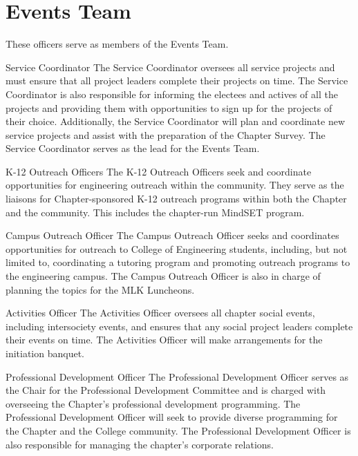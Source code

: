 \section{Events Team}
These officers serve as members of the Events Team.
\begin{enumsubsection}
\item{Service Coordinator} The Service Coordinator oversees all service projects and must ensure that all project leaders complete their projects on time. The Service Coordinator is also responsible for informing the electees and actives of all the projects and providing them with opportunities to sign up for the projects of their choice. Additionally, the Service Coordinator will plan and coordinate new service projects and assist with the preparation of the Chapter Survey. The Service Coordinator serves as the lead for the Events Team. 

\item{K-12 Outreach Officers} The K-12 Outreach Officers seek and coordinate opportunities for engineering outreach within the community.  They serve as the liaisons for Chapter-sponsored K-12 outreach programs within both the Chapter and the community. This includes the chapter-run MindSET program. 

\item{Campus Outreach Officer} The Campus Outreach Officer seeks and coordinates opportunities for outreach to College of Engineering students, including, but not limited to, coordinating a tutoring program and promoting outreach programs to the engineering campus. The Campus Outreach Officer is also in charge of planning the topics for the MLK Luncheons.

\item{Activities Officer} The Activities Officer oversees all chapter social events, including intersociety events, and ensures that any social project leaders complete their events on time. The Activities Officer will make arrangements for the initiation banquet. 

\item{Professional Development Officer} The Professional Development Officer serves as the Chair for the Professional Development Committee and is charged with overseeing the Chapter's professional development programming. The Professional Development Officer will seek to provide diverse programming for the Chapter and the College community. The Professional Development Officer is also responsible for managing the chapter's corporate relations.  
\end{enumsubsection}

